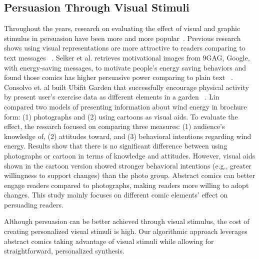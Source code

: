 \subsection{Persuasion Through Visual Stimuli}
Throughout the years, research on evaluating the effect of visual and graphic stimulus in persuasion have been more and more popular~\cite{selker2015sweetbuildinggreeter,consolvo2008activity}. Previous research shows using visual representations are more attractive to readers comparing to text messages ~\cite{selker2015sweetbuildinggreeter,consolvo2008activity}. Selker et al. retrieves motivational images from 9GAG, Google, with energy-saving messages, to motivate people's energy saving behaviors and found those comics has higher persuasive power comparing to plain text ~\cite{selker2015sweetbuildinggreeter}. Consolvo et. al built Ubifit Garden that successfully encourage physical activity by present user's exercise data as different elements in a garden ~\cite{consolvo2008activity}. Lin ~\cite{lin2013impact} compared two models of presenting information about wind energy in brochure form: (1) photographs and (2) using cartoons as visual aids. To evaluate the effect, the research focused on comparing three measures: (1) audience's knowledge of, (2) attitudes toward, and (3) behavioral intentions regarding wind energy. Results show that there is no significant difference between using photographs or cartoon in terms of knowledge and attitudes. However, visual aids shown in the cartoon version showed stronger behavioral intentions (e.g., greater willingness to support changes) than the photo group. Abstract comics can better engage readers compared to photographs, making readers more willing to adopt changes. This study mainly focuses on different comic elements' effect on persuading readers.

Although persuasion can be better achieved through visual stimulus, the cost of creating personalized visual stimuli is high. Our algorithmic approach leverages abstract comics taking advantage of visual stimuli while allowing for straightforward, personalized synthesis.
